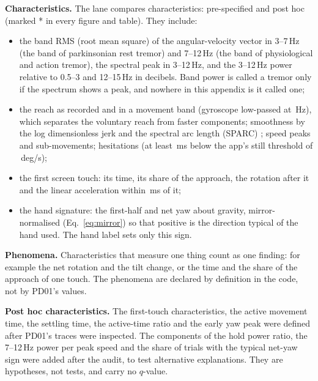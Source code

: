\textbf{Characteristics.}
The lane compares  characteristics:  pre-specified and  post hoc (marked * in every figure and table).
They include:
\begin{itemize}[nosep]
  \item the band RMS (root mean square) of the angular-velocity vector in 3--7\,Hz (the band of parkinsonian rest tremor) and 7--12\,Hz (the band of physiological and action tremor), the spectral peak in 3--12\,Hz, and the 3--12\,Hz power relative to 0.5--3 and 12--15\,Hz in decibels. Band power is called a tremor only if the spectrum shows a peak, and nowhere in this appendix is it called one;
  \item the reach as recorded and in a movement band (gyroscope low-passed at \,Hz), which separates the voluntary reach from faster components; smoothness by the log dimensionless jerk and the spectral arc length (SPARC) \cite{melendezcalderon2021smoothness}; speed peaks and sub-movements; hesitations (at least \,ms below the app's still threshold of \,deg/s);
  \item the first screen touch: its time, its share of the approach, the rotation after it and the linear acceleration within \,ms of it;
  \item the hand signature: the first-half and net yaw about gravity, mirror-normalised (Eq.~\ref{eq:mirror}) so that positive is the direction typical of the hand used. The hand label sets only this sign.
\end{itemize}

\textbf{Phenomena.}
Characteristics that measure one thing count as one finding: for example the net rotation and the tilt change, or the time and the share of the approach of one touch.
The  phenomena are declared by definition in the code, not by PD01's values.

\textbf{Post hoc characteristics.}
The first-touch characteristics, the active movement time, the settling time, the active-time ratio and the early yaw peak were defined after PD01's traces were inspected.
The components of the hold power ratio, the 7--12\,Hz power per peak speed and the share of trials with the typical net-yaw sign were added after the audit, to test alternative explanations.
They are hypotheses, not tests, and carry no $q$-value.

